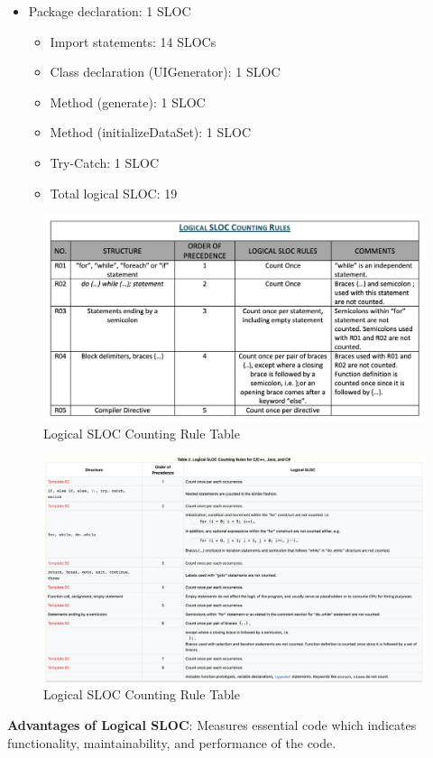 \documentclass[12pt,letterpaper]{report}
\begin{document}
\begin{itemize}
    \item Package declaration: 1 SLOC
    \\
    \begin{itemize}
    
    \item Import statements: 14 SLOCs
    \item Class declaration (UIGenerator): 1 SLOC
    \item Method (generate): 1 SLOC
    \item Method (initializeDataSet): 1 SLOC
    \item Try-Catch: 1 SLOC
    \item Total logical SLOC: 19\\
    
    \end{itemize}
\end{itemize}
\begin{figure}
    \begin{center}
    \includegraphics[width=1\linewidth]{UCC.png}
    \end{center}
       \caption{Logical SLOC Counting Rule Table\label{Logical SLOC Counting Rule Table}}
\end{figure}
\begin{figure}
    \begin{center}
    \includegraphics[width=1\linewidth]{UCC2.png}
    \end{center}
       \caption{Logical SLOC Counting Rule Table\label{Logical SLOC Counting Rule Table}}
\end{figure}
\textbf{Advantages of Logical SLOC}: Measures essential code which indicates functionality, maintainability, and performance of the code.  \\
\end{document}
